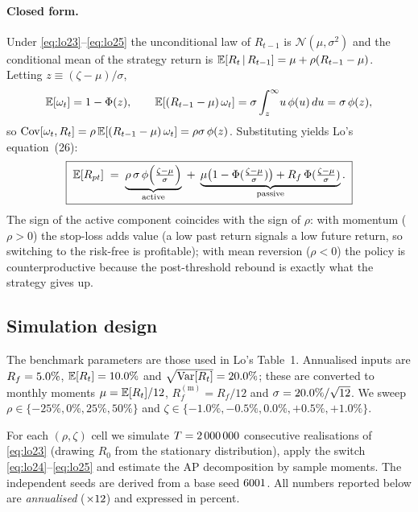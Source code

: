 \paragraph{Closed form.} Under \eqref{eq:lo23}--\eqref{eq:lo25} the
unconditional law of $R_{t-1}$ is $\mathcal{N}(\mu,\sigma^2)$ and the
conditional mean of the strategy return is
$\mathbb{E}[R_t\,|\, R_{t-1}]=\mu+\rho(R_{t-1}-\mu)$. Letting $z\equiv(\zeta-\mu)/\sigma$,
\[
\mathbb{E}[\omega_t]=1-\Phi(z),\qquad
\mathbb{E}[(R_{t-1}-\mu)\,\omega_t]
   = \sigma\int_{z}^{\infty}\!u\,\phi(u)\,du
   = \sigma\,\phi(z),
\]
so $\operatorname{Cov}[\omega_t,R_t]=\rho\,\mathbb{E}[(R_{t-1}-\mu)\,\omega_t]=\rho\sigma\,\phi(z)$.
Substituting yields Lo's equation~(26):
\begin{equation}\label{eq:lo26}
\boxed{\;
\mathbb{E}[R_{pt}] \;=\;
   \underbrace{\rho\,\sigma\,\phi\!\left(\tfrac{\zeta-\mu}{\sigma}\right)}_{\text{active}}
   \;+\;
   \underbrace{\mu\bigl(1-\Phi(\tfrac{\zeta-\mu}{\sigma})\bigr)
              + R_f\,\Phi(\tfrac{\zeta-\mu}{\sigma})}_{\text{passive}}.
\;}
\end{equation}
The sign of the active component coincides with the sign of $\rho$: with
momentum ($\rho>0$) the stop-loss adds value (a low past return signals a
low future return, so switching to the risk-free is profitable); with
mean reversion ($\rho<0$) the policy is counterproductive because the
post-threshold rebound is exactly what the strategy gives up.

\subsection{Simulation design}

The benchmark parameters are those used in Lo's Table~1. Annualised
inputs are $R_f=5.0\%$, $\mathbb{E}[R_t]=10.0\%$ and
$\sqrt{\operatorname{Var}[R_t]}=20.0\%$; these are converted to monthly
moments $\mu=\mathbb{E}[R_t]/12$, $R_f^{(\text{m})}=R_f/12$ and
$\sigma=20.0\%/\sqrt{12}$. We sweep
$\rho\in\{-25\%,0\%,25\%,50\%\}$ and
$\zeta\in\{-1.0\%,-0.5\%,0.0\%,+0.5\%,+1.0\%\}$.

For each $(\rho,\zeta)$ cell we simulate $T=2\,000\,000$ consecutive
realisations of \eqref{eq:lo23} (drawing $R_0$ from the stationary
distribution), apply the switch \eqref{eq:lo24}--\eqref{eq:lo25} and
estimate the AP decomposition by sample moments. The independent
seeds are derived from a base seed $6001$. All numbers reported
below are \emph{annualised} ($\times12$) and expressed in
percent.

